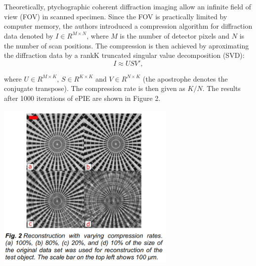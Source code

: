 \documentclass{article}
\begin{document}
\section{\cite{Loetgering_undated-wt} }

Theoretically, ptychographic coherent diffraction imaging allow an infinite field of view (FOV) in scanned specimen. Since the FOV is practically limited by computer memory, the authors introduced a compression algorithm for diffraction data denoted by $I \in R^{M\times N}$, where $M$ is the number of detector pixels and $N$ is the number of scan positions.
The compression is then achieved by aproximating the diffraction data by a rankK truncated singular value decomposition (SVD):
\begin{equation}
    I \approx USV',
\end{equation}

where $U \in R^{M \times K}$, $S \in R^{K \times K}$ and $V \in R^{N \times K}$ (the apostrophe denotes the conjugate transpose). The compression rate is then given as $K/ N$. The results after 1000 iterations of ePIE are shown in Figure 2.

\begin{center}
\includegraphics[width=0.65\textwidth]{figures/compression_ePIE.png}
\end{center}

\printbibliography
\end{document}
